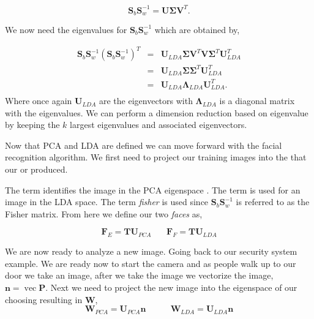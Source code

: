 \begin{equation}
\mathbf{S}_b\mathbf{S}_w^{-1} = \mathbf{U}\mathbf{\Sigma}\mathbf{V}^T.
\end{equation}

We now need the eigenvalues for $\mathbf{S}_b\mathbf{S}_w^{-1}$ which are obtained by,

\begin{eqnarray}
\mathbf{S}_b\mathbf{S}_w^{-1}(\mathbf{S}_b\mathbf{S}_w^{-1})^T &=& \mathbf{U}_{LDA}\mathbf{\Sigma}\mathbf{V}^T\mathbf{V}\mathbf{\Sigma}^T\mathbf{U}_{LDA}^T\\
&=& \mathbf{U}_{LDA}\mathbf{\Sigma}\mathbf{\Sigma}^T\mathbf{U}_{LDA}^T\\
&=& \mathbf{U}_{LDA}\mathbf{\Lambda}_{LDA}\mathbf{U}_{LDA}^T.\\
\end{eqnarray}
\noindent
Where once again $\mathbf{U}_{LDA}$ are the eigenvectors with $\mathbf{\Lambda}_{LDA}$ is a diagonal matrix with the eigenvalues. We can perform a dimension reduction based on eigenvalue by keeping the $k$ largest eigenvalues and associated eigenvectors. 

Now that \ac{PCA} and \ac{LDA} are defined we can move forward with the facial recognition algorithm. We first need to project our training images into the  that our  or  produced. 

The term \emph{} identifies the image in the \ac{PCA} eigenspace \cite{turk1991eigenfaces}. The term \emph{} is used for an image in the \ac{LDA} space. The term \emph{fisher} is used since $\mathbf{S}_b\mathbf{S}_w^{-1}$ is referred to as the Fisher matrix. From here we define our two \emph{faces} as,

\begin{equation}
\mathbf{F}_E = \mathbf{T}\mathbf{U}_{PCA}~~~~~~~~\mathbf{F}_F = \mathbf{T}\mathbf{U}_{LDA}
\end{equation}	

We are now ready to analyze a new image. Going back to our security system example. We are ready now to start the camera and as people walk up to our door we take an image, after we take the image we vectorize the image, $\mathbf{n}=\operatorname{vec}{\mathbf{P}}$. Next we need to project the new image into the eigenspace of our choosing resulting in $\mathbf{W}$,
\begin{equation}
\mathbf{W}_{PCA} = \mathbf{U}_{PCA}\mathbf{n} ~~~~~~~~~~~~~ \mathbf{W}_{LDA} = \mathbf{U}_{LDA}\mathbf{n}
\end{equation}	


